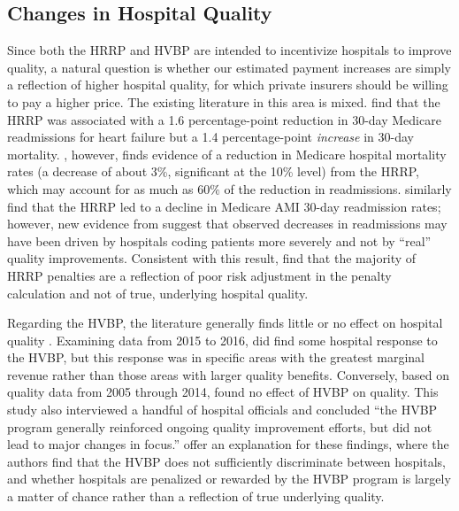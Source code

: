 \documentclass[12pt]{article}
\begin{document}
\subsection{Changes in Hospital Quality}
Since both the HRRP and HVBP are intended to incentivize hospitals to improve quality, a natural question is whether our estimated payment increases are simply a reflection of higher hospital quality, for which private insurers should be willing to pay a higher price. The existing literature in this area is mixed. \cite{gupta2018} find that the HRRP was associated with a 1.6 percentage-point reduction in 30-day Medicare readmissions for heart failure but a 1.4 percentage-point \textit{increase} in 30-day mortality. \cite{gupta2016}, however, finds evidence of a reduction in Medicare hospital mortality rates (a decrease of about 3\%, significant at the 10\% level) from the HRRP, which may account for as much as 60$\%$ of the reduction in readmissions. \cite{mellor2016} similarly find that the HRRP led to a decline in Medicare AMI 30-day readmission rates; however, new evidence from \cite{Ibrahim2017} suggest that observed decreases in readmissions may have been driven by hospitals coding patients more severely and not by ``real'' quality improvements. Consistent with this result, \cite{wilcock2018} find that the majority of HRRP penalties are a reflection of poor risk adjustment in the penalty calculation and not of true, underlying hospital quality.

Regarding the HVBP, the literature generally finds little or no effect on hospital quality \citep{ryan2015,doran2017,norton2017,ryan2017}. Examining data from 2015 to 2016, \cite{norton2017} did find some hospital response to the HVBP, but this response was in specific areas with the greatest marginal revenue rather than those areas with larger quality benefits. Conversely, based on quality data from 2005 through 2014, \cite{gao2015} found no effect of HVBP on quality. This study also interviewed a handful of hospital officials and concluded ``the HVBP program generally reinforced ongoing quality improvement efforts, but did not lead to major changes in focus.'' \cite{friedson2016} offer an explanation for these findings, where the authors find that the HVBP does not sufficiently discriminate between hospitals, and whether hospitals are penalized or rewarded by the HVBP program is largely a matter of chance rather than a reflection of true underlying quality.
\end{document}
